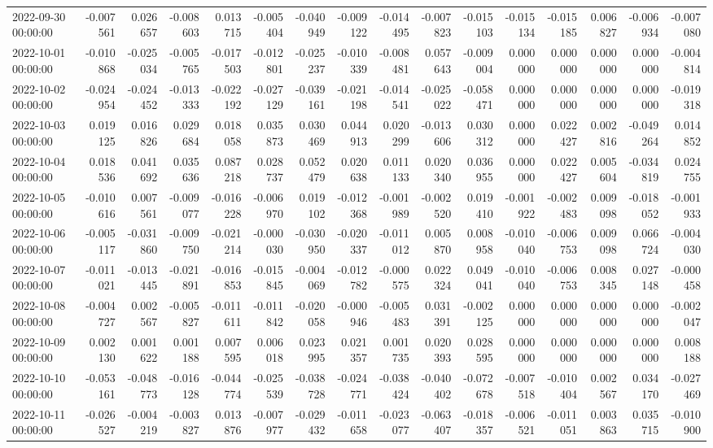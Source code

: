 \begin{tabular}{lrrrrrrrrrrrrrrr}
2022-09-30 00:00:00 & -0.007561 & 0.026657 & -0.008603 & 0.013715 & -0.005404 & -0.040949 & -0.009122 & -0.014495 & -0.007823 & -0.015103 & -0.015134 & -0.015185 & 0.006827 & -0.006934 & -0.007080 \\
2022-10-01 00:00:00 & -0.010868 & -0.025034 & -0.005765 & -0.017503 & -0.012801 & -0.025237 & -0.010339 & -0.008481 & 0.057643 & -0.009004 & 0.000000 & 0.000000 & 0.000000 & 0.000000 & -0.004814 \\
2022-10-02 00:00:00 & -0.024954 & -0.024452 & -0.013333 & -0.022192 & -0.027129 & -0.039161 & -0.021198 & -0.014541 & -0.025022 & -0.058471 & 0.000000 & 0.000000 & 0.000000 & 0.000000 & -0.019318 \\
2022-10-03 00:00:00 & 0.019125 & 0.016826 & 0.029684 & 0.018058 & 0.035873 & 0.030469 & 0.044913 & 0.020299 & -0.013606 & 0.030312 & 0.000000 & 0.022427 & 0.002816 & -0.049264 & 0.014852 \\
2022-10-04 00:00:00 & 0.018536 & 0.041692 & 0.035636 & 0.087218 & 0.028737 & 0.052479 & 0.020638 & 0.011133 & 0.020340 & 0.036955 & 0.000000 & 0.022427 & 0.005604 & -0.034819 & 0.024755 \\
2022-10-05 00:00:00 & -0.010616 & 0.007561 & -0.009077 & -0.016228 & -0.006970 & 0.019102 & -0.012368 & -0.001989 & -0.002520 & 0.019410 & -0.001922 & -0.002483 & 0.009098 & -0.018052 & -0.001933 \\
2022-10-06 00:00:00 & -0.005117 & -0.031860 & -0.009750 & -0.021214 & -0.000030 & -0.030950 & -0.020337 & -0.011012 & 0.005870 & 0.008958 & -0.010040 & -0.006753 & 0.009098 & 0.066724 & -0.004030 \\
2022-10-07 00:00:00 & -0.011021 & -0.013445 & -0.021891 & -0.016853 & -0.015845 & -0.004069 & -0.012782 & -0.000575 & 0.022324 & 0.049041 & -0.010040 & -0.006753 & 0.008345 & 0.027148 & -0.000458 \\
2022-10-08 00:00:00 & -0.004727 & 0.002567 & -0.005827 & -0.011611 & -0.011842 & -0.020058 & -0.000946 & -0.005483 & 0.031391 & -0.002125 & 0.000000 & 0.000000 & 0.000000 & 0.000000 & -0.002047 \\
2022-10-09 00:00:00 & 0.002130 & 0.001622 & 0.001188 & 0.007595 & 0.006018 & 0.023995 & 0.021357 & 0.001735 & 0.020393 & 0.028595 & 0.000000 & 0.000000 & 0.000000 & 0.000000 & 0.008188 \\
2022-10-10 00:00:00 & -0.053161 & -0.048773 & -0.016128 & -0.044774 & -0.025539 & -0.038728 & -0.024771 & -0.038424 & -0.040402 & -0.072678 & -0.007518 & -0.010404 & 0.002567 & 0.034170 & -0.027469 \\
2022-10-11 00:00:00 & -0.026527 & -0.004219 & -0.003827 & 0.013876 & -0.007977 & -0.029432 & -0.011658 & -0.023077 & -0.063407 & -0.018357 & -0.006521 & -0.011051 & 0.003863 & 0.035715 & -0.010900 \\

\end{tabular}
